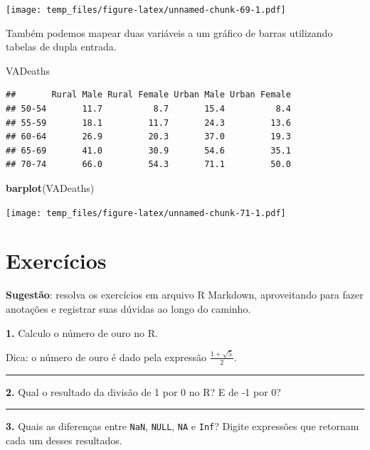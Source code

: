 \documentclass[
]{book}
\newenvironment{Shaded}{\begin{snugshade}}{\end{snugshade}}
\newcommand{\KeywordTok}[1]{\textcolor[rgb]{0.13,0.29,0.53}{\textbf{#1}}}
\newcommand{\NormalTok}[1]{#1}
\begin{document}
\texttt{[image: temp\_files/figure-latex/unnamed-chunk-69-1.pdf]}

Também podemos mapear duas variáveis a um gráfico de barras utilizando tabelas de dupla entrada.

\begin{Shaded}
\begin{Highlighting}[]
\NormalTok{VADeaths}
\end{Highlighting}
\end{Shaded}

\begin{verbatim}
##       Rural Male Rural Female Urban Male Urban Female
## 50-54       11.7          8.7       15.4          8.4
## 55-59       18.1         11.7       24.3         13.6
## 60-64       26.9         20.3       37.0         19.3
## 65-69       41.0         30.9       54.6         35.1
## 70-74       66.0         54.3       71.1         50.0
\end{verbatim}

\begin{Shaded}
\begin{Highlighting}[]
\KeywordTok{barplot}\NormalTok{(VADeaths)}
\end{Highlighting}
\end{Shaded}

\texttt{[image: temp\_files/figure-latex/unnamed-chunk-71-1.pdf]}

\hypertarget{exercuxedcios}{%
\section{Exercícios}\label{exercuxedcios}}

\textbf{Sugestão}: resolva os exercícios em arquivo R Markdown, aproveitando para fazer anotações e registrar suas dúvidas ao longo do caminho.

\textbf{1.} Calculo o número de ouro no R.

Dica: o número de ouro é dado pela expressão \(\frac{1 + \sqrt{5}}{2}\).

\begin{center}\rule{0.5\linewidth}{0.5pt}\end{center}

\textbf{2.} Qual o resultado da divisão de 1 por 0 no R? E de -1 por 0?

\begin{center}\rule{0.5\linewidth}{0.5pt}\end{center}

\textbf{3.} Quais as diferenças entre \texttt{NaN}, \texttt{NULL}, \texttt{NA} e \texttt{Inf}? Digite expressões que retornam cada um desses resultados.
\end{document}
